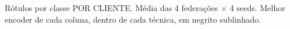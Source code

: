 \begin{table}[htbp]
\centering
\small
\caption{Cross-device: acurácia (\%) por técnica, regime de rótulo e encoder}
\label{tab:t4_crossdevice_regime}

\par\vspace{2pt}\footnotesize Rótulos por classe POR CLIENTE. Média das 4 federações $\times$ 4 seeds. Melhor encoder de cada coluna, dentro de cada técnica, em negrito sublinhado.
\end{table}
